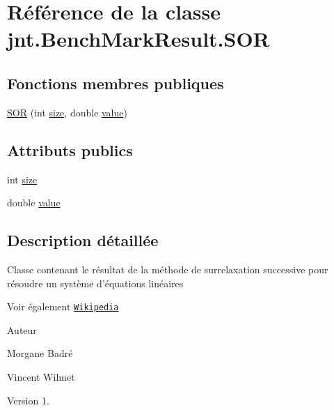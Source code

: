\hypertarget{classjnt_1_1BenchMarkResult_1_1SOR}{\section{Référence de la classe jnt.\-Bench\-Mark\-Result.\-S\-O\-R}
\label{classjnt_1_1BenchMarkResult_1_1SOR}
}
\subsection*{Fonctions membres publiques}
\begin{DoxyCompactItemize}
\item 
\hyperlink{classjnt_1_1BenchMarkResult_1_1SOR_a78cbdd1234914949e07aff08c2ff9e03}{S\-O\-R} (int \hyperlink{classjnt_1_1BenchMarkResult_1_1SOR_ad3a37b811350f4fa2368a9a9973b8fb6}{size}, double \hyperlink{classjnt_1_1BenchMarkResult_1_1SOR_a607ca1495e3a8f4f92a550f415a9a96f}{value})
\end{DoxyCompactItemize}
\subsection*{Attributs publics}
\begin{DoxyCompactItemize}
\item 
int \hyperlink{classjnt_1_1BenchMarkResult_1_1SOR_ad3a37b811350f4fa2368a9a9973b8fb6}{size}
\item 
double \hyperlink{classjnt_1_1BenchMarkResult_1_1SOR_a607ca1495e3a8f4f92a550f415a9a96f}{value}
\end{DoxyCompactItemize}


\subsection{Description détaillée}
Classe contenant le résultat de la méthode de surrelaxation successive pour résoudre un système d'équations linéaires \begin{DoxySeeAlso}{Voir également}
\href{http://fr.wikipedia.org/wiki/M%C3%A9thode_de_surrelaxation_successive}{\tt Wikipedia} 
\end{DoxySeeAlso}
\begin{DoxyAuthor}{Auteur}

\begin{DoxyItemize}
\item Morgane Badré 
\item Vincent Wilmet 
\end{DoxyItemize}
\end{DoxyAuthor}
\begin{DoxyVersion}{Version}
1. 
\end{DoxyVersion}


